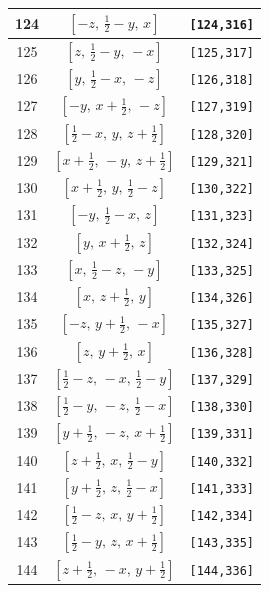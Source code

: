 \documentclass[fleqn,8pt]{jsarticle}
\begin{document}
\begin{longtable}{ccc}
124 & $\left[ - z,\, \frac{1}{2} - y,\, x \right]$ & {\tt [124,316]} \\ \hline
125 & $\left[ z,\, \frac{1}{2} - y,\, - x \right]$ & {\tt [125,317]} \\ \hline
126 & $\left[ y,\, \frac{1}{2} - x,\, - z \right]$ & {\tt [126,318]} \\ \hline
127 & $\left[ - y,\, x + \frac{1}{2},\, - z \right]$ & {\tt [127,319]} \\ \hline
128 & $\left[ \frac{1}{2} - x,\, y,\, z + \frac{1}{2} \right]$ & {\tt [128,320]} \\ \hline
129 & $\left[ x + \frac{1}{2},\, - y,\, z + \frac{1}{2} \right]$ & {\tt [129,321]} \\ \hline
130 & $\left[ x + \frac{1}{2},\, y,\, \frac{1}{2} - z \right]$ & {\tt [130,322]} \\ \hline
131 & $\left[ - y,\, \frac{1}{2} - x,\, z \right]$ & {\tt [131,323]} \\ \hline
132 & $\left[ y,\, x + \frac{1}{2},\, z \right]$ & {\tt [132,324]} \\ \hline
133 & $\left[ x,\, \frac{1}{2} - z,\, - y \right]$ & {\tt [133,325]} \\ \hline
134 & $\left[ x,\, z + \frac{1}{2},\, y \right]$ & {\tt [134,326]} \\ \hline
135 & $\left[ - z,\, y + \frac{1}{2},\, - x \right]$ & {\tt [135,327]} \\ \hline
136 & $\left[ z,\, y + \frac{1}{2},\, x \right]$ & {\tt [136,328]} \\ \hline
137 & $\left[ \frac{1}{2} - z,\, - x,\, \frac{1}{2} - y \right]$ & {\tt [137,329]} \\ \hline
138 & $\left[ \frac{1}{2} - y,\, - z,\, \frac{1}{2} - x \right]$ & {\tt [138,330]} \\ \hline
139 & $\left[ y + \frac{1}{2},\, - z,\, x + \frac{1}{2} \right]$ & {\tt [139,331]} \\ \hline
140 & $\left[ z + \frac{1}{2},\, x,\, \frac{1}{2} - y \right]$ & {\tt [140,332]} \\ \hline
141 & $\left[ y + \frac{1}{2},\, z,\, \frac{1}{2} - x \right]$ & {\tt [141,333]} \\ \hline
142 & $\left[ \frac{1}{2} - z,\, x,\, y + \frac{1}{2} \right]$ & {\tt [142,334]} \\ \hline
143 & $\left[ \frac{1}{2} - y,\, z,\, x + \frac{1}{2} \right]$ & {\tt [143,335]} \\ \hline
144 & $\left[ z + \frac{1}{2},\, - x,\, y + \frac{1}{2} \right]$ & {\tt [144,336]} \\ \hline

\end{longtable}
\end{document}
